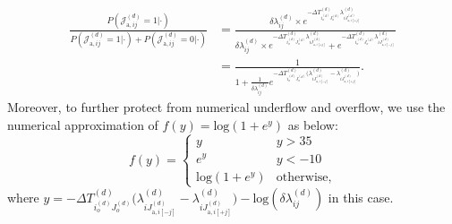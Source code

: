 \documentclass[a4paper]{article}
\begin{document}
              \begin{equation}
              \begin{aligned}
              \frac{P(\mathcal{J}^{(d)}_{\mbox{a}, ij}=1|\cdot)}{P(\mathcal{J}^{(d)}_{\mbox{a}, ij}=1|\cdot) + P(\mathcal{J}^{(d)}_{\mbox{a}, ij}=0|\cdot)} 
             & = \frac{\delta\lambda^{(d)}_{ij}\times e^{-\Delta T^{(d)}_{i_o^{(d)}J_o^{(d)}}\lambda^{(d)}_{iJ^{(d)}_{\mbox{a}, i[+j]}}}}{\delta\lambda^{(d)}_{ij}\times e^{-\Delta T^{(d)}_{i_o^{(d)}J_o^{(d)}}\lambda^{(d)}_{iJ^{(d)}_{\mbox{a}, i[+j]}}} + e^{-\Delta T^{(d)}_{i_o^{(d)}J_o^{(d)}}\lambda^{(d)}_{iJ^{(d)}_{\mbox{a}, i[-j]}}} }\\&
              = \frac{1}{1+ \frac{1}{\delta\lambda^{(d)}_{ij}}e^{-\Delta T^{(d)}_{i_o^{(d)}J_o^{(d)}}\big(\lambda^{(d)}_{iJ^{(d)}_{\mbox{a}, i[-j]}} - \lambda^{(d)}_{iJ^{(d)}_{\mbox{a}, i[+j]}} \big)}}.
              \end{aligned}
              \end{equation}
         Moreover, to further protect from numerical underflow and overflow, we use the numerical approximation of $f(y) = \mbox{log}(1+ e^y)$ as below: 
         \begin{equation*}
         f(y) = \begin{cases}
         y &y >35\\
         e^y & y<-10\\
         \mbox{log}(1+e^y) & \mbox{otherwise},
         \end{cases}
         \end{equation*}
         where $y = -\Delta T^{(d)}_{i_o^{(d)}J_o^{(d)}}\big(\lambda^{(d)}_{iJ^{(d)}_{\mbox{a}, i[-j]}} - \lambda^{(d)}_{iJ^{(d)}_{\mbox{a}, i[+j]}}\big)- \mbox{log}(\delta\lambda^{(d)}_{ij})$ in this case.
   \iffalse
\end{document}
